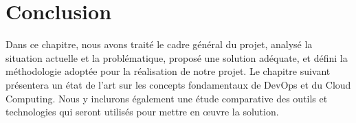 \section*{Conclusion}
Dans ce chapitre, nous avons traité le cadre général du projet, analysé la situation actuelle et la problématique, proposé une solution adéquate, et défini la méthodologie adoptée pour la réalisation de notre projet. Le chapitre suivant présentera un état de l'art sur les concepts fondamentaux de DevOps et du Cloud Computing. Nous y inclurons également une étude comparative des outils et technologies qui seront utilisés pour mettre en œuvre la solution.



